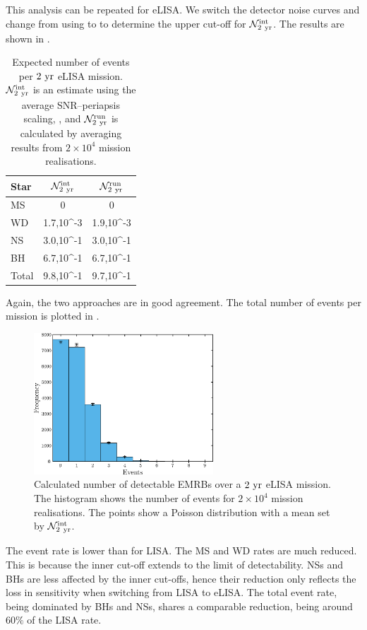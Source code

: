 This analysis can be repeated for eLISA. We switch the detector noise curves and change from using  to  to determine the upper cut-off for $\mathcal{N}_{2~\mathrm{yr}}^\mathrm{int}$. The results are shown in .
\begin{table}\footnotesize
\centering
  \begin{tabular}{l D{,}{\,\times\,}{3.4} D{,}{\,\times\,}{3.4}}
  \toprule
  Star &  &  \\ \midrule
  MS &  &  \\
  WD & 1.7,10^{-3} & 1.9,10^{-3} \\
  NS & 3.0,10^{-1} & 3.0,10^{-1}  \\
  BH & 6.7,10^{-1} & 6.7,10^{-1} \\
  \midrule
  Total & 9.8,10^{-1} & 9.7,10^{-1} \\
  \bottomrule
\end{tabular}
  \caption{Expected number of events per $2~\mathrm{yr}$ eLISA mission. $\mathcal{N}_{2~\mathrm{yr}}^\mathrm{int}$ is an estimate using the average SNR--periapsis scaling, , and $\mathcal{N}_{2~\mathrm{yr}}^\mathrm{run}$ is calculated by averaging results from $2 \times 10^4$ mission realisations.}\label{tab:eLISA-Rates}
\end{table}
Again, the two approaches are in good agreement. The total number of events per mission is plotted in .
\begin{figure}%
\centering
   \includegraphics[width=0.6\textwidth]{./images/Fig_Total_event_hist_eLISA}
\caption{Calculated number of detectable EMRBs over a $2~\mathrm{yr}$ eLISA mission. The histogram shows the number of events for $2 \times 10^4$ mission realisations. The points show a Poisson distribution with a mean set by $\mathcal{N}_{2~\mathrm{yr}}^\mathrm{int}$.}
\label{fig:eLISA-Event-no}
\end{figure}
The event rate is lower than for LISA. The MS and WD rates are much reduced. This is because the inner cut-off extends to the limit of detectability. NSs and BHs are less affected by the inner cut-offs, hence their reduction only reflects the loss in sensitivity when switching from LISA to eLISA. The total event rate, being dominated by BHs and NSs, shares a comparable reduction, being around $60\%$ of the LISA rate.


